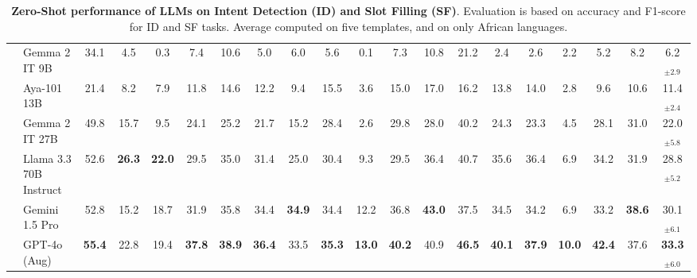 \begin{table}[!htpb]
{\begin{tabular}{l|l|cccccccccccccccccc}
& Gemma 2 IT 9B & 34.1 & 4.5 & 0.3 & 7.4 & 10.6 & 5.0 & 6.0 & 5.6 & 0.1 & 7.3 & 10.8 & 21.2 & 2.4 & 2.6 & 2.2 & 5.2 & 8.2 & 6.2$_{\pm2.9}$ \\ %
& Aya-101 13B & 21.4 & 8.2 & 7.9 & 11.8 & 14.6 & 12.2 & 9.4 & 15.5 & 3.6 & 15.0 & 17.0 & 16.2 & 13.8 & 14.0 & 2.8 & 9.6 & 10.6 & 11.4$_{\pm2.4}$ \\
& Gemma 2 IT 27B & 49.8 & 15.7 & 9.5 & 24.1 & 25.2 & 21.7 & 15.2 & 28.4 & 2.6 & 29.8 & 28.0 & 40.2 & 24.3 & 23.3 & 4.5 & 28.1 & 31.0 & 22.0$_{\pm5.8}$ \\
\rowcolor{Gray}
\cellcolor{white}
& Llama 3.3 70B Instruct & 52.6 & \textbf{26.3} & \textbf{22.0} & 29.5 & 35.0 & 31.4 & 25.0 & 30.4 & 9.3 & 29.5 & 36.4 & 40.7 & 35.6 & 36.4 & 6.9 & 34.2 & 31.9 & 28.8$_{\pm5.2}$ \\
\cmidrule{2-20}
& Gemini 1.5 Pro & 52.8 & 15.2 & 18.7 & 31.9 & 35.8 & 34.4 & \textbf{34.9} & 34.4 & 12.2 & 36.8 & \textbf{43.0} & 37.5 & 34.5 & 34.2 & 6.9 & 33.2 & \textbf{38.6} & 30.1$_{\pm6.1}$ \\
\rowcolor{LightCyan}
\cellcolor{white}
& GPT-4o (Aug) & \textbf{55.4} & 22.8 & 19.4 & \textbf{37.8} & \textbf{38.9} & \textbf{36.4} & 33.5 & \textbf{35.3} & \textbf{13.0} & \textbf{40.2} & 40.9 & \textbf{46.5} & \textbf{40.1} & \textbf{37.9} & \textbf{10.0} & \textbf{42.4} & 37.6 & \textbf{33.3$_{\pm6.0}$} \\
\bottomrule
\end{tabular}%
}
\vspace{-2mm}
\caption{\textbf{Zero-Shot performance of LLMs on Intent Detection (ID) and Slot Filling (SF)}. Evaluation is based on accuracy and F1-score for ID and SF tasks. Average computed on five templates, and on only African languages.}%
\label{tab:prompt-results}
\end{table}
